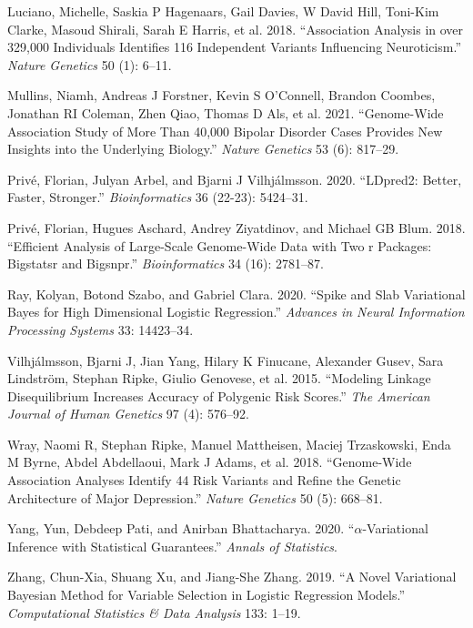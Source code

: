 \documentclass[
  11pt,
  letterpaper,
  DIV=11,
  numbers=noendperiod]{scrartcl}
\newlength{\cslhangindent}
\newlength{\cslentryspacingunit} %
\newenvironment{CSLReferences}[2] %
 {%
  \setlength{\parindent}{0pt}
  \ifodd #1
  \let\oldpar\par
  \def\par{\hangindent=\cslhangindent\oldpar}
  \fi
  \setlength{\parskip}{#2\cslentryspacingunit}
 }%
 {}
\begin{document}
\begin{CSLReferences}{1}{0}
\leavevmode{}%
Luciano, Michelle, Saskia P Hagenaars, Gail Davies, W David Hill,
Toni-Kim Clarke, Masoud Shirali, Sarah E Harris, et al. 2018.
{``Association Analysis in over 329,000 Individuals Identifies 116
Independent Variants Influencing Neuroticism.''} \emph{Nature Genetics}
50 (1): 6--11.

\leavevmode{}%
Mullins, Niamh, Andreas J Forstner, Kevin S O'Connell, Brandon Coombes,
Jonathan RI Coleman, Zhen Qiao, Thomas D Als, et al. 2021.
{``Genome-Wide Association Study of More Than 40,000 Bipolar Disorder
Cases Provides New Insights into the Underlying Biology.''} \emph{Nature
Genetics} 53 (6): 817--29.

\leavevmode{}%
Privé, Florian, Julyan Arbel, and Bjarni J Vilhjálmsson. 2020.
{``LDpred2: Better, Faster, Stronger.''} \emph{Bioinformatics} 36
(22-23): 5424--31.

\leavevmode{}%
Privé, Florian, Hugues Aschard, Andrey Ziyatdinov, and Michael GB Blum.
2018. {``Efficient Analysis of Large-Scale Genome-Wide Data with Two r
Packages: Bigstatsr and Bigsnpr.''} \emph{Bioinformatics} 34 (16):
2781--87.

\leavevmode{}%
Ray, Kolyan, Botond Szabo, and Gabriel Clara. 2020. {``Spike and Slab
Variational Bayes for High Dimensional Logistic Regression.''}
\emph{Advances in Neural Information Processing Systems} 33: 14423--34.

\leavevmode{}%
Vilhjálmsson, Bjarni J, Jian Yang, Hilary K Finucane, Alexander Gusev,
Sara Lindström, Stephan Ripke, Giulio Genovese, et al. 2015. {``Modeling
Linkage Disequilibrium Increases Accuracy of Polygenic Risk Scores.''}
\emph{The American Journal of Human Genetics} 97 (4): 576--92.

\leavevmode{}%
Wray, Naomi R, Stephan Ripke, Manuel Mattheisen, Maciej Trzaskowski,
Enda M Byrne, Abdel Abdellaoui, Mark J Adams, et al. 2018.
{``Genome-Wide Association Analyses Identify 44 Risk Variants and Refine
the Genetic Architecture of Major Depression.''} \emph{Nature Genetics}
50 (5): 668--81.

\leavevmode{}%
Yang, Yun, Debdeep Pati, and Anirban Bhattacharya. 2020.
{``\(\alpha\)-Variational Inference with Statistical Guarantees.''}
\emph{Annals of Statistics}.

\leavevmode{}%
Zhang, Chun-Xia, Shuang Xu, and Jiang-She Zhang. 2019. {``A Novel
Variational Bayesian Method for Variable Selection in Logistic
Regression Models.''} \emph{Computational Statistics \& Data Analysis}
133: 1--19.

\end{CSLReferences}
\end{document}
